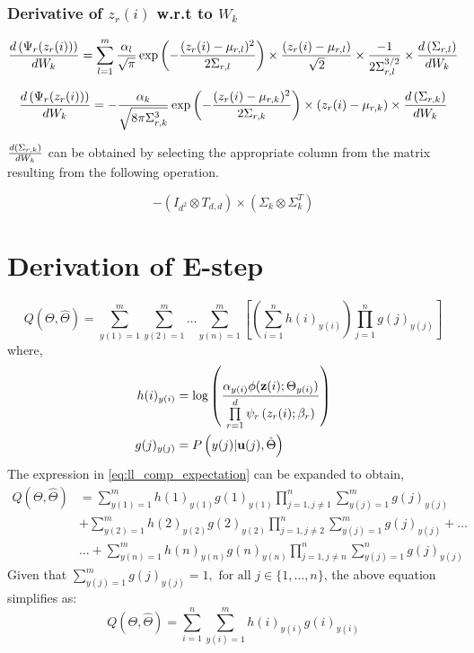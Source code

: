 \documentclass[]{article}
\begin{document}
\subsubsection*{Derivative of $z_r(i)$ w.r.t to $W_k$}
\begin{equation}
\der{W_k}{\Psi_r(z_r(i))}= \sum\limits_{l=1}^{m}\frac{\alpha_l}{\sqrt{\pi}}\exp\left( - \frac{(z_r(i)-\mu_{r,l})^2}{2\Sigma_{r,l}}	 \right) \times \frac{(z_r(i)-\mu_{r,l})}{\sqrt{2}} \times \frac{-1}{2\Sigma_{r,l}^{3/2}} \times \der{W_k}{\Sigma_{r,l}}
\end{equation}

\begin{equation}
\der{W_k}{\Psi_r(z_r(i))}= -\frac{\alpha_k}{\sqrt{8\pi\Sigma^3_{r,k}}}\exp\left( - \frac{(z_r(i)-\mu_{r,k})^2}{2\Sigma_{r,k}}	 \right) \times (z_r(i)-\mu_{r,k})\times \der{W_k}{\Sigma_{r,k}}
\end{equation}

$\der{W_k}{\Sigma_{r,k}}$ can be obtained by selecting the appropriate column from the matrix resulting from the following operation.

\begin{equation}
-(I_{d^2} \otimes T_{d,d})\times(\Sigma_k \otimes \Sigma_k^T)
\end{equation}

\section{Derivation of E-step}\label{sec:Estep_derivation}
\begin{equation} \label{eq:ll_comp_expectation}
Q(\Theta,\hat{\Theta})=\sum\limits_{y(1)=1}^m \sum\limits_{y(2)=1}^m \ldots \sum\limits_{y(n)=1}^m \left[ \left( \sum\limits_{i=1}^{n}h(i)_{y(i)}  \right) \prod\limits_{j=1}^{n}g(j)_{y(j)} \right]
\end{equation}
where, 
\begin{align*}
h(i)_{y(i)} &= \log \left(\frac{\alpha_{y(i)}\phi(\invCDF{i}; \Theta_{y(i)})}{\llDenom{i}} \right) \\
g(j)_{y(j)} &= P\left(y(j)|\textbf{u}(j),\hat{\Theta}\right)
\end{align*} 
The expression in \ref{eq:ll_comp_expectation} can be expanded to obtain,
\begin{align}
Q(\Theta,\hat{\Theta}) &= \sum\limits_{y(1)=1}^m h(1)_{y(1)}g(1)_{y(1)} \prod\limits_{j=1,j\neq 1}^n \sum\limits_{y(j)=1}^m g(j)_{y(j)} \nonumber \\
& + \sum\limits_{y(2)=1}^m h(2)_{y(2)}g(2)_{y(2)}\prod\limits_{j=1,j\neq 2}^n \sum\limits_{y(j)=1}^m g(j)_{y(j)} + \ldots  \nonumber \\ 
& \ldots + \sum\limits_{y(n)=1}^m h(n)_{y(n)}g(n)_{y(n)}\prod\limits_{j=1,j\neq n}^n \sum\limits_{y(j)=1}^n g(j)_{y(j)}
\end{align}
Given that $\sum\limits_{y(j)=1}^m g(j)_{y(j)} = 1, \text{ for all }  j \in \{1,\ldots, n\} $, the above equation simplifies as:
\begin{equation}
Q(\Theta,\hat{\Theta}) = \sum\limits_{i=1}^{n}\sum\limits_{y(i)=1}^m h(i)_{y(i)}g(i)_{y(i)}
\end{equation}
\end{document}
